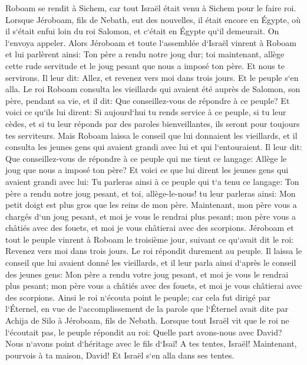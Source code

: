 \verse Roboam se rendit à Sichem, car tout Israël était venu à Sichem pour le faire roi. 
\verse Lorsque Jéroboam, fils de Nebath, eut des nouvelles, il était encore en Égypte, où il s`était enfui loin du roi Salomon, et c`était en Égypte qu`il demeurait. 
\verse On l`envoya appeler. Alors Jéroboam et toute l`assemblée d`Israël vinrent à Roboam et lui parlèrent ainsi: 
\verse Ton père a rendu notre joug dur; toi maintenant, allège cette rude servitude et le joug pesant que nous a imposé ton père. Et nous te servirons. 
\verse Il leur dit: Allez, et revenez vers moi dans trois jours. Et le peuple s`en alla. 
\verse Le roi Roboam consulta les vieillards qui avaient été auprès de Salomon, son père, pendant sa vie, et il dit: Que conseillez-vous de répondre à ce peuple? 
\verse Et voici ce qu`ils lui dirent: Si aujourd`hui tu rends service à ce peuple, si tu leur cèdes, et si tu leur réponds par des paroles bienveillantes, ils seront pour toujours tes serviteurs. 
\verse Mais Roboam laissa le conseil que lui donnaient les vieillards, et il consulta les jeunes gens qui avaient grandi avec lui et qui l`entouraient. 
\verse Il leur dit: Que conseillez-vous de répondre à ce peuple qui me tient ce langage: Allège le joug que nous a imposé ton père? 
\verse Et voici ce que lui dirent les jeunes gens qui avaient grandi avec lui: Tu parleras ainsi à ce peuple qui t`a tenu ce langage: Ton père a rendu notre joug pesant, et toi, allège-le-nous! tu leur parleras ainsi: Mon petit doigt est plus gros que les reins de mon père. 
\verse Maintenant, mon père vous a chargés d`un joug pesant, et moi je vous le rendrai plus pesant; mon père vous a châtiés avec des fouets, et moi je vous châtierai avec des scorpions. 
\verse Jéroboam et tout le peuple vinrent à Roboam le troisième jour, suivant ce qu`avait dit le roi: Revenez vers moi dans trois jours. 
\verse Le roi répondit durement au peuple. Il laissa le conseil que lui avaient donné les vieillards, 
\verse et il leur parla ainsi d`après le conseil des jeunes gens: Mon père a rendu votre joug pesant, et moi je vous le rendrai plus pesant; mon père vous a châtiés avec des fouets, et moi je vous châtierai avec des scorpions. 
\verse Ainsi le roi n`écouta point le peuple; car cela fut dirigé par l`Éternel, en vue de l`accomplissement de la parole que l`Éternel avait dite par Achija de Silo à Jéroboam, fils de Nebath. 
\verse Lorsque tout Israël vit que le roi ne l`écoutait pas, le peuple répondit au roi: Quelle part avons-nous avec David? Nous n`avons point d`héritage avec le fils d`Isaï! A tes tentes, Israël! Maintenant, pourvois à ta maison, David! Et Israël s`en alla dans ses tentes. 
